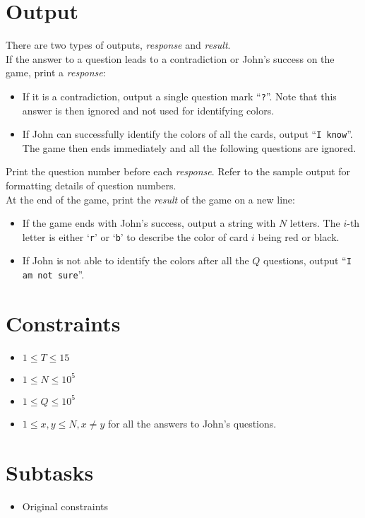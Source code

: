 \section*{Output}

There are two types of outputs, {\it response} and {\it result}.\\

If the answer to a question leads to a contradiction or John's success on the game, print a {\it response}:
\begin{itemize}
\item If it is a contradiction, output a single question mark ``{\tt ?}''.
Note that this answer is then ignored and not used for identifying colors.
\item If John can successfully identify the colors of all the cards, output ``{\tt I know}''.
The game then ends immediately and all the following questions are ignored.
\end{itemize}

Print the question number before each {\it response}.
Refer to the sample output for formatting details of question numbers.\\

At the end of the game, print the {\it result} of the game on a new line:
\begin{itemize}
\item If the game ends with John's success, output a string with $N$ letters.
The $i$-th letter is either `{\tt r}' or `{\tt b}' to describe the color of card $i$ being red or black.
\item If John is not able to identify the colors after all the $Q$ questions, output ``{\tt I am not sure}''.
\end{itemize}

\section*{Constraints}
\begin{itemize}
\item $1 \leq T\leq 15$
\item $1 \leq N \leq 10^5$
\item $1 \leq Q \leq 10^5$
\item $1\leq x, y \leq N, x \neq y$ for all the answers to John's questions.
\end{itemize}

\section*{Subtasks}
\begin{itemize}
\item Original constraints
\end{itemize}
